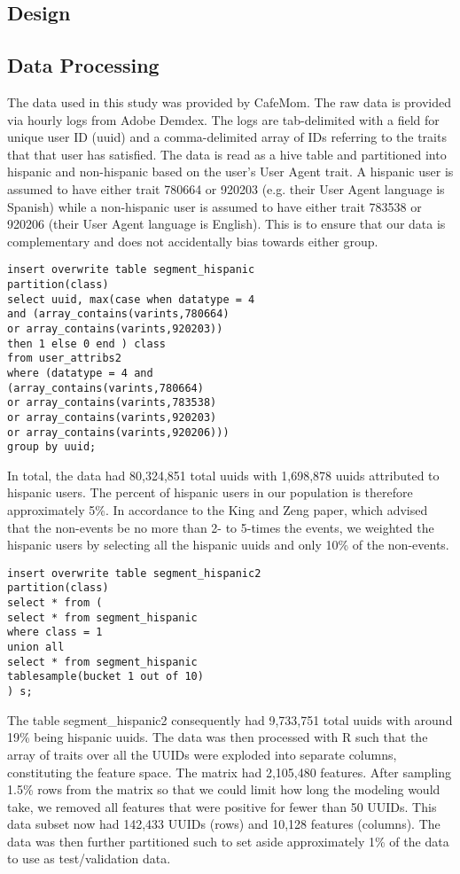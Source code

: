 \documentclass[a4paper]{article}
\begin{document}
\begin{multicols}{2}
\section*{Design}
\subsection*{Data Processing}
The data used in this study was provided by CafeMom. The raw data is provided via hourly logs from Adobe Demdex. The logs are tab-delimited with a field for unique user ID (uuid) and a comma-delimited array of IDs referring to the traits that that user has satisfied. The data is read as a hive table and partitioned into hispanic and non-hispanic based on the user's User Agent trait. A hispanic user is assumed to have either trait 780664 or 920203 (e.g. their User Agent language is Spanish) while a non-hispanic user is assumed to have either trait 783538 or 920206 (their User Agent language is English). This is to ensure that our data is complementary and does not accidentally bias towards either group.

\begin{verbatim}
insert overwrite table segment_hispanic 
partition(class)
select uuid, max(case when datatype = 4 
and (array_contains(varints,780664) 
or array_contains(varints,920203))
then 1 else 0 end ) class
from user_attribs2
where (datatype = 4 and 
(array_contains(varints,780664) 
or array_contains(varints,783538) 
or array_contains(varints,920203) 
or array_contains(varints,920206)))
group by uuid;
\end{verbatim}

In total, the data had 80,324,851 total uuids with 1,698,878 uuids attributed to hispanic users. The percent of hispanic users in our population is therefore approximately 5\%. In accordance to the King and Zeng paper, which advised that the non-events be no more than 2- to 5-times the events, we weighted the hispanic users by selecting all the hispanic uuids and only 10\% of the non-events.
\begin{verbatim}
insert overwrite table segment_hispanic2
partition(class)
select * from ( 
select * from segment_hispanic 
where class = 1 
union all 
select * from segment_hispanic 
tablesample(bucket 1 out of 10)
) s;
\end{verbatim}

The table segment\_hispanic2 consequently had 9,733,751 total uuids with around 19\% being hispanic uuids. The data was then processed with R such that the array of traits over all the UUIDs were exploded into separate columns, constituting the feature space. The matrix had 2,105,480 features. After sampling 1.5\% rows from the matrix so that we could limit how long the modeling would take, we removed all features  that were positive for fewer than 50 UUIDs. This data subset now had 142,433 UUIDs (rows) and 10,128 features (columns). The data was then further partitioned such to set aside approximately 1\% of the data to use as test/validation data.



\end{multicols}
\end{document}
